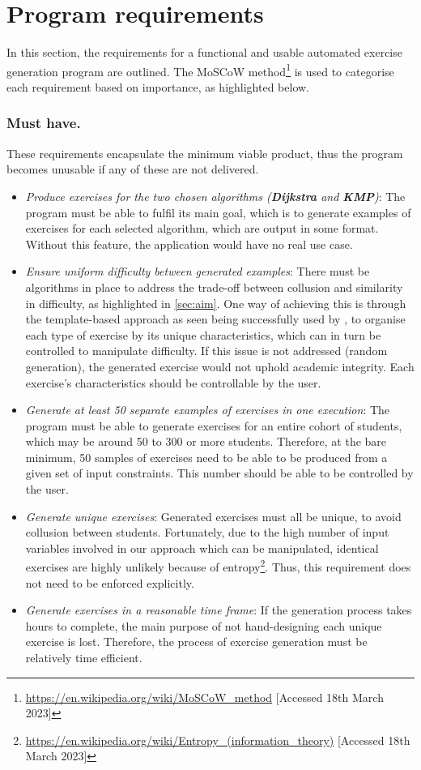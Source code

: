 \documentclass{l4proj}
\begin{document}
\section{Program requirements}

In this section, the requirements for a functional and usable automated exercise generation program are outlined. The MoSCoW method\footnote{\url{https://en.wikipedia.org/wiki/MoSCoW_method} [Accessed 18th March 2023]} is used to categorise each requirement based on importance, as highlighted below.

\subsubsection{Must have.}

These requirements encapsulate the minimum viable product, thus the program becomes unusable if any of these are not delivered.
\begin{itemize}
	\item
	\emph{Produce exercises for the two chosen algorithms (\textbf{Dijkstra} and \textbf{KMP})}: The program must be able to fulfil its main goal, which is to generate examples of exercises for each 		selected algorithm, which are output in some format. Without this feature, the application would have no real use case. 
	\item
	\emph{Ensure uniform difficulty between generated examples}: There must be algorithms in place to address the trade-off between collusion and similarity in difficulty, as highlighted in \autoref{sec:aim}. One way of achieving this is through the template-based approach as seen being successfully used by \cite{Sad12}, to organise each type of exercise by its unique characteristics, which can in turn be controlled to manipulate difficulty. If this issue is not addressed (random generation), the generated exercise would not uphold academic integrity. Each exercise's characteristics should be controllable by the user.
	\item
	\emph{Generate at least 50 separate examples of exercises in one execution}: The program must be able to generate exercises for an entire cohort of students, which may be around 50 to 300 or more students. Therefore, at the bare minimum, 50 samples of exercises need to be able to be produced from a given set of input constraints. This number should be able to be controlled by the user.
	\item
	\emph{Generate unique exercises}: Generated exercises must all be unique, to avoid collusion between students. Fortunately, due to the high number of input variables involved in our approach which can be manipulated, identical exercises are highly unlikely because of entropy\footnote{\url{https://en.wikipedia.org/wiki/Entropy_(information_theory)} [Accessed 18th March 2023]}. Thus, this requirement does not need to be enforced explicitly.
	\item
	\emph{Generate exercises in a reasonable time frame}: If the generation process takes hours to complete, the main purpose of not hand-designing each unique exercise is lost. Therefore, the process of exercise generation must be relatively time efficient. 
\end{itemize}
\end{document}
